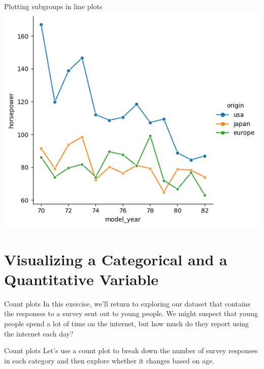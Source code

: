 \documentclass[
  ignorenonframetext,
]{beamer}
\begin{document}
\begin{frame}{Plotting subgroups in line plots}
\label{plotting-subgroups-in-line-plots-8}
\includegraphics{../images/im276.png}
\end{frame}

\section{Visualizing a Categorical and a Quantitative
Variable}\label{visualizing-a-categorical-and-a-quantitative-variable}

\begin{frame}{Count plots}
\label{count-plots}
In this exercise, we'll return to exploring our dataset that contains
the responses to a survey sent out to young people. We might suspect
that young people spend a lot of time on the internet, but how much do
they report using the internet each day?
\end{frame}

\begin{frame}{Count plots}
\label{count-plots-1}
Let's use a count plot to break down the number of survey responses in
each category and then explore whether it changes based on age.
\end{frame}
\end{document}
